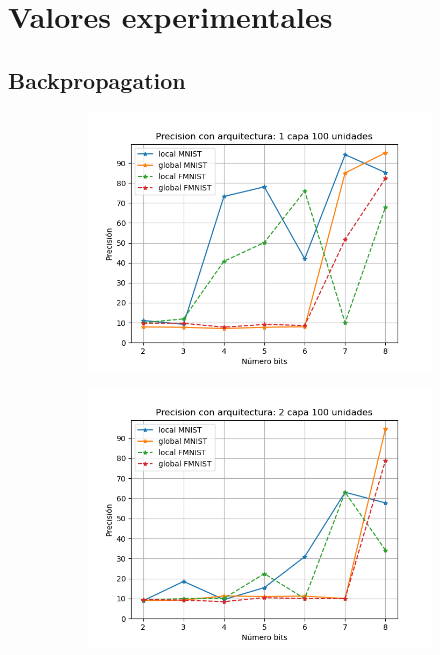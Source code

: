 \chapter{Valores experimentales} \label{implementacion}

\section{Backpropagation}
\begin{figure}[H]
    \centering
    \begin{subfigure}[H]{0.45\textwidth}
    \includegraphics[width=\textwidth]{imagenes/backprop/Precision con arquitectura: 1 capa 100 unidades.png}
    \end{subfigure}
    \begin{subfigure}[H]{0.45\textwidth}
    \includegraphics[width=\textwidth]{imagenes/backprop/Precision con arquitectura: 2 capa 100 unidades.png}

\end{subfigure}
\end{figure}

